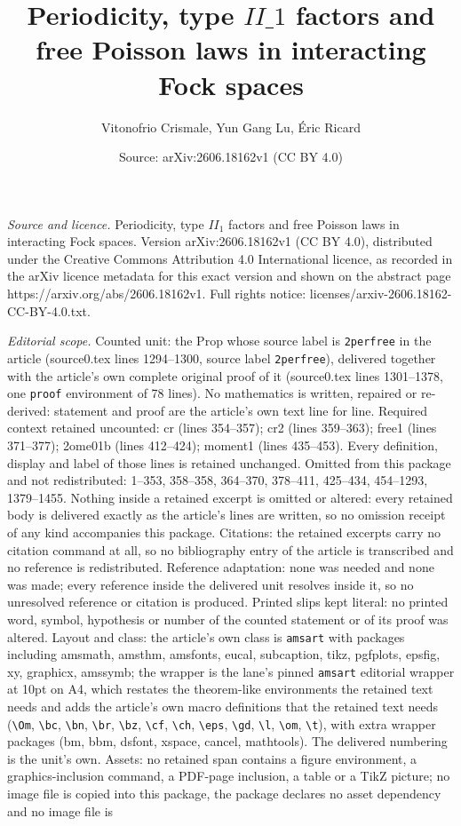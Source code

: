\documentclass[10pt,a4paper]{amsart}
\title[Periodicity, type $II\_1$ factors and free Poisson laws in in]{Periodicity, type $II\_1$ factors and free Poisson laws in interacting Fock spaces}
\author{Vitonofrio Crismale, Yun Gang Lu, \'Eric Ricard}
\date{Source: arXiv:2606.18162v1 (CC BY 4.0)}
\begin{document}
\maketitle

\noindent\emph{Source and licence.} Periodicity, type $II_1$ factors and free Poisson laws in interacting Fock spaces. Version arXiv:2606.18162v1 (CC BY 4.0), distributed under the Creative Commons Attribution 4.0 International licence, as recorded in the arXiv licence metadata for this exact version and shown on the abstract page https://arxiv.org/abs/2606.18162v1. Full rights notice: licenses/arxiv-2606.18162-CC-BY-4.0.txt.\par\smallskip

\noindent\textit{Editorial scope.} Counted unit: the Prop whose source label is \texttt{2perfree} in the article (source0.tex lines 1294--1300, source label \texttt{2perfree}), delivered together with the article's own complete original proof of it (source0.tex lines 1301--1378, one \texttt{proof} environment of 78 lines). No mathematics is written, repaired or re-derived: statement and proof are the article's own text line for line. Required context retained uncounted: cr (lines 354--357); cr2 (lines 359--363); free1 (lines 371--377); 2ome01b (lines 412--424); moment1 (lines 435--453). Every definition, display and label of those lines is retained unchanged. Omitted from this package and not redistributed: 1--353, 358--358, 364--370, 378--411, 425--434, 454--1293, 1379--1455. Nothing inside a retained excerpt is omitted or altered: every retained body is delivered exactly as the article's lines are written, so no omission receipt of any kind accompanies this package. Citations: the retained excerpts carry no citation command at all, so no bibliography entry of the article is transcribed and no reference is redistributed. Reference adaptation: none was needed and none was made; every reference inside the delivered unit resolves inside it, so no unresolved reference or citation is produced. Printed slips kept literal: no printed word, symbol, hypothesis or number of the counted statement or of its proof was altered. Layout and class: the article's own class is \texttt{amsart} with packages including amsmath, amsthm, amsfonts, eucal, subcaption, tikz, pgfplots, epsfig, xy, graphicx, amssymb; the wrapper is the lane's pinned \texttt{amsart} editorial wrapper at 10pt on A4, which restates the theorem-like environments the retained text needs and adds the article's own macro definitions that the retained text needs (\texttt{\textbackslash Om}, \texttt{\textbackslash bc}, \texttt{\textbackslash bn}, \texttt{\textbackslash br}, \texttt{\textbackslash bz}, \texttt{\textbackslash cf}, \texttt{\textbackslash ch}, \texttt{\textbackslash eps}, \texttt{\textbackslash gd}, \texttt{\textbackslash l}, \texttt{\textbackslash om}, \texttt{\textbackslash t}), with extra wrapper packages (bm, bbm, dsfont, xspace, cancel, mathtools). The delivered numbering is the unit's own. Assets: no retained span contains a figure environment, a graphics-inclusion command, a PDF-page inclusion, a table or a TikZ picture; no image file is copied into this package, the package declares no asset dependency and no image file is 
\end{document}
